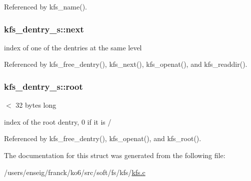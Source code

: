 Referenced by kfs\-\_\-name().

\hypertarget{structkfs__dentry__s_a17c6495def8c6564de45ab64cbc49066}{
\subsubsection[{next}]{ kfs\-\_\-dentry\-\_\-s\-::next}}\label{structkfs__dentry__s_a17c6495def8c6564de45ab64cbc49066}


index of one of the dentries at the same level 



Referenced by kfs\-\_\-free\-\_\-dentry(), kfs\-\_\-next(), kfs\-\_\-openat(), and kfs\-\_\-readdir().

\hypertarget{structkfs__dentry__s_aed21f3f5ab2de70ab3416afe6dd9e4d4}{
\subsubsection[{root}]{ kfs\-\_\-dentry\-\_\-s\-::root}}\label{structkfs__dentry__s_aed21f3f5ab2de70ab3416afe6dd9e4d4}


$<$ 32 bytes long 

index of the root dentry, 0 if it is / 

Referenced by kfs\-\_\-free\-\_\-dentry(), kfs\-\_\-openat(), and kfs\-\_\-root().



The documentation for this struct was generated from the following file\-:\begin{DoxyCompactItemize}
\item 
/users/enseig/franck/ko6/src/soft/fs/kfs/\hyperlink{kfs_8c}{kfs.\-c}\end{DoxyCompactItemize}
